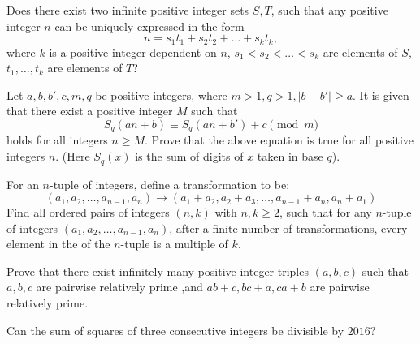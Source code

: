 \documentclass[problems.tex]{subfile}
\begin{document}
	
	
	\begin{problem}
		Does there exist two infinite positive integer sets $S,T$, such that any positive integer $n$ can be uniquely expressed in the form
		$$n=s_1t_1+s_2t_2+\dots+s_kt_k,$$where $k$ is a positive integer dependent on $n$, $s_1<s_2<\dots<s_k$ are elements of $S$, $t_1,\dots, t_k$ are elements of $T$? %
	\end{problem}
	
	
	
	\begin{problem}
		Let $a,b,b',c,m,q$ be positive integers, where $m>1,q>1,|b-b'|\ge a$. It is given that there exist a positive integer $M$ such that
		$$S_q(an+b)\equiv S_q(an+b')+c\pmod{m}$$
		holds for all integers $n\ge M$. Prove that the above equation is true for all positive integers $n$. (Here $S_q(x)$ is the sum of digits of $x$ taken in base $q$). %
	\end{problem}
	
	
	
	\begin{problem}
		For an $n$-tuple of integers, define a transformation to be:
		$$(a_1,a_2,\dots,a_{n-1},a_n)\rightarrow (a_1+a_2, a_2+a_3, \dots, a_{n-1}+a_n, a_n+a_1)$$
		Find all ordered pairs of integers $(n,k)$ with $n,k\geq 2$, such that for any $n$-tuple of integers $(a_1,a_2,\dots,a_{n-1},a_n)$, after a finite number of transformations, every element in the of the $n$-tuple is a multiple of $k$. %
	\end{problem}
	
	
	
	\begin{problem}
		Prove that there exist infinitely many positive integer triples $(a,b,c)$ such that $a ,b,c$ are pairwise relatively prime ,and $ab+c ,bc+a ,ca+b$ are pairwise relatively prime. %
	\end{problem}
	
	
	
	
	\begin{problem}
		Can the sum of squares of three consecutive integers be divisible by $2016$?
	\end{problem}
	
\end{document}

